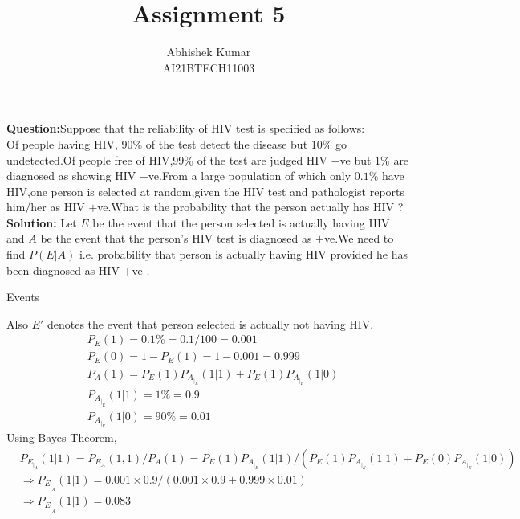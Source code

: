 \documentclass[journal, 8pt, twocolumn]{IEEEtran}
\title{Assignment 5 \\}
\author{Abhishek Kumar\\AI21BTECH11003}
\begin{document}
	\maketitle
	\textbf{Question:}Suppose that the reliability of HIV test is specified as follows:\\
	Of people having HIV, $90$\% of the test detect the disease but 10\% go undetected.Of people free of HIV,$99$\% of the test are judged HIV $-$ve but $1$\% are diagnosed as showing HIV $+$ve.From a large population of which only $0.1$\% have HIV,one person is selected at random,given the HIV test and pathologist reports him/her as HIV $+$ve.What is the probability that the person actually has HIV ?\\
	
	\textbf{Solution:}
	Let $E$ be the event that the person selected is actually having HIV and $A$ be the event that the person's HIV test is diagnosed as $+$ve.We need to find $P(E|A)$ i.e. probability that person is actually having HIV provided he has been diagnosed as HIV $+$ve .
	
	\begin{table}[ht!]
		\centering
		
		\caption{Events}
		\label{Table:1}
	\end{table}
	
	
	Also    $E'$ denotes the event that person selected is actually not having HIV.
	\begin{align}
	&P_E(1)=0.1\%=0.1/100=0.001\\
	&P_E(0)=1-P_E(1)=1-0.001=0.999\\
	&P_A(1)=P_E(1)P_A_|_E(1|1)+P_E(1)P_A_|_E(1|0)\\
	&P_A_|_E(1|1)=1\%=0.9\\
	&P_A_|_E(1|0)=90\%=0.01
	\end{align}
	Using Bayes Theorem,
	\begin{align}
	    &P_E_|_A(1|1)=P_E_A(1,1)/P_A(1)=P_E(1)P_A_|_E(1|1)/(P_E(1)P_A_|_E(1|1)+P_E(0)P_A_|_E(1|0))\\
	    &\Rightarrow P_E_|_A(1|1)=0.001\times0.9/(0.001\times0.9+0.999\times0.01)\\
	    &\Rightarrow P_E_|_A(1|1)=0.083 
	\end{align}
	
\end{document}
